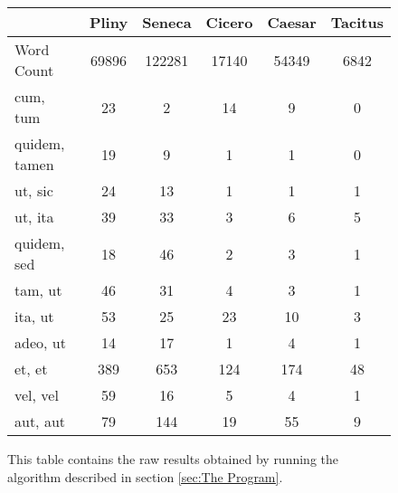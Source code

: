 \begin{figure}[h]
  \begin{center}
    \begin{tabular}{| l || c | c | c | c | c |}
      \hline
      & Pliny & Seneca & Cicero & Caesar & Tacitus \\ \hline \hline
      Word Count & 69896 & 122281 & 17140 & 54349 & 6842 \\ \hline
      cum, tum & 23 & 2 & 14 & 9 & 0 \\ \hline
      quidem, tamen & 19 & 9 & 1 & 1 & 0 \\ \hline
      ut, sic & 24 & 13 & 1 & 1 & 1 \\ \hline
      ut, ita & 39 & 33 & 3 & 6 & 5 \\ \hline
      quidem, sed & 18 & 46 & 2 & 3 & 1 \\ \hline
      tam, ut & 46 & 31 & 4 & 3 & 1 \\ \hline
      ita, ut & 53 & 25 & 23 & 10 & 3 \\ \hline
      adeo, ut & 14 & 17 & 1 & 4 & 1 \\ \hline
      et, et & 389 & 653 & 124 & 174 & 48 \\ \hline
      vel, vel & 59 & 16 & 5 & 4 & 1 \\ \hline
      aut, aut & 79 & 144 & 19 & 55 & 9 \\
      \hline
    \end{tabular}
  \end{center}
  \caption{\label{fig:results}This table contains the raw results obtained by running the algorithm described in section \ref{sec:The Program}.}
\end{figure}

